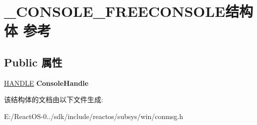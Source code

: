 \hypertarget{struct___c_o_n_s_o_l_e___f_r_e_e_c_o_n_s_o_l_e}{}\section{\+\_\+\+C\+O\+N\+S\+O\+L\+E\+\_\+\+F\+R\+E\+E\+C\+O\+N\+S\+O\+L\+E结构体 参考}
\label{struct___c_o_n_s_o_l_e___f_r_e_e_c_o_n_s_o_l_e}
\subsection*{Public 属性}
\begin{DoxyCompactItemize}
\item 
\mbox{\label{struct___c_o_n_s_o_l_e___f_r_e_e_c_o_n_s_o_l_e_a93ef97f68c374d81e714e72430b6271d}} 
\hyperlink{interfacevoid}{H\+A\+N\+D\+LE} {\bfseries Console\+Handle}
\end{DoxyCompactItemize}


该结构体的文档由以下文件生成\+:\begin{DoxyCompactItemize}
\item 
E\+:/\+React\+O\+S-\/0../sdk/include/reactos/subsys/win/conmsg.\+h\end{DoxyCompactItemize}
